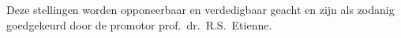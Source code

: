 \documentclass{propositions}
\begin{document}
{\bigskip
\bigskip

\begin{center}
Deze stellingen worden opponeerbaar en verdedigbaar geacht en zijn als 
zodanig goedgekeurd door de promotor prof.\ dr.\ R.S.\ Etienne.
\end{center}

}
\end{document}
